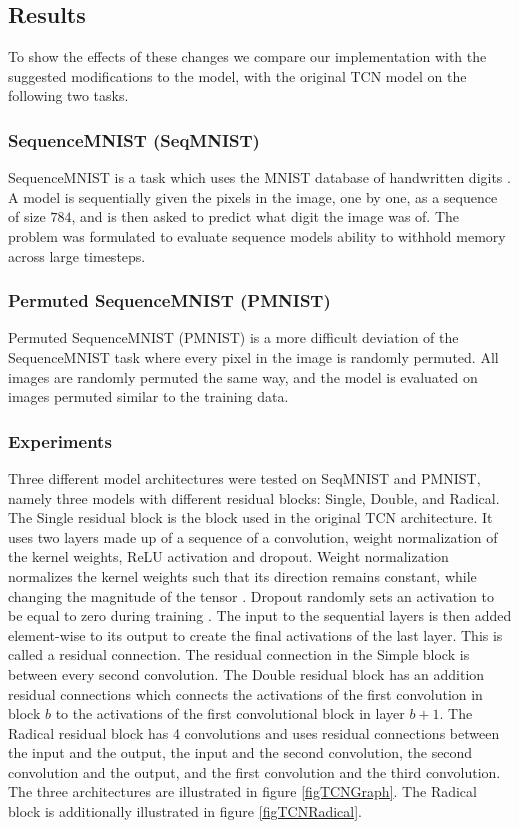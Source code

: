 \documentclass[a4paper, twoside]{article}
\begin{document}
\subsection{Results}
To show the effects of these changes we compare our implementation with the suggested modifications to the model, with the original TCN model \cite{tcn} on the following two tasks.

\subsubsection{SequenceMNIST (SeqMNIST)}
SequenceMNIST is a task which uses the MNIST database of handwritten digits \cite{MNIST}. A model is sequentially given the pixels in the image, one by one, as a sequence of size $784$, and is then asked to predict what digit the image was of. The problem was formulated to evaluate sequence models ability to withhold memory across large timesteps.

\subsubsection{Permuted SequenceMNIST (PMNIST)}
Permuted SequenceMNIST (PMNIST) is a more difficult deviation of the SequenceMNIST task where every pixel in the image is randomly permuted. All images are randomly permuted the same way, and the model is evaluated on images permuted similar to the training data.

\subsubsection{Experiments}
Three different model architectures were tested on SeqMNIST and PMNIST, namely three models with different residual blocks: Single, Double, and Radical. The Single residual block is the block used in the original TCN \cite{tcn} architecture. It uses two layers made up of a sequence of a convolution, weight normalization of the kernel weights, ReLU activation and dropout. Weight normalization normalizes the kernel weights such that its direction remains constant, while changing the magnitude of the tensor \cite{pytorch}. Dropout randomly sets an activation to be equal to zero during training \cite{cs231n}. The input to the sequential layers is then added element-wise to its output to create the final activations of the last layer. This is called a residual connection. The residual connection in the Simple block is between every second convolution. The Double residual block has an addition residual connections which connects the activations of the first convolution in block $b$ to the activations of the first convolutional block in layer $b+1$. The Radical residual block has 4 convolutions and uses residual connections between the input and the output, the input and the second convolution, the second convolution and the output, and the first convolution and the third convolution. The three architectures are illustrated in figure \ref{figTCNGraph}. The Radical block is additionally illustrated in figure \ref{figTCNRadical}.
\end{document}
